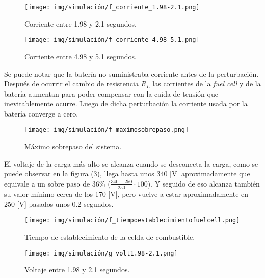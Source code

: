 \begin{figure}[H]
    \centering
    \texttt{[image: img/simulación/f\_corriente\_1.98-2.1.png]}
    \caption{Corriente entre 1.98 y 2.1 segundos.}
    \label{fig:f_corriente_1.98-2.1}
\end{figure}

\begin{figure}[H]
    \centering
    \texttt{[image: img/simulación/f\_corriente\_4.98-5.1.png]}
    \caption{Corriente entre 4.98 y 5.1 segundos.}
\label{fig:f_corriente_4.98-5.1}
\end{figure}

Se puede notar que la batería no suministraba corriente antes de la perturbación. 
Después de ocurrir el cambio de resistencia $R_L$ las corrientes de la \textit{fuel cell} y de
la batería aumentan para poder compensar con la caida de tensión que inevitablemente ocurre. 
Luego de dicha perturbación la corriente usada por la batería converge a cero. 

\begin{figure}[H]
    \centering
    \texttt{[image: img/simulación/f\_maximosobrepaso.png]}
    \caption{Máximo sobrepaso del sistema.}
\label{fig:f_maximosobrepaso}
\end{figure}

El voltaje de la carga más alto se alcanza cuando se desconecta la carga, como se puede observar 
en la figura (\ref{fig:f_maximosobrepaso}), llega hasta unos 340 [V] aproximadamente
que equivale a un sobre paso de 36\% ($\frac{340-250}{250} \cdot 100$). Y seguido de eso alcanza 
también su valor mínimo cerca de los 170 [V], pero vuelve a estar aproximadamente en 250 [V]
pasados unos 0.2 segundos.

\begin{figure}[H]
    \centering
    \texttt{[image: img/simulación/f\_tiempoestablecimientofuelcell.png]}
    \caption{Tiempo de establecimiento de la celda de combustible.}
    \label{fig:f_tiempoestablecimientofuelcell}
\end{figure}



\begin{figure}[H]
    \centering
    \texttt{[image: img/simulación/g\_volt1.98-2.1.png]}
    \caption{Voltaje entre 1.98 y 2.1 segundos.}
    \label{fig:g_volt1.98-2.1}
\end{figure}

